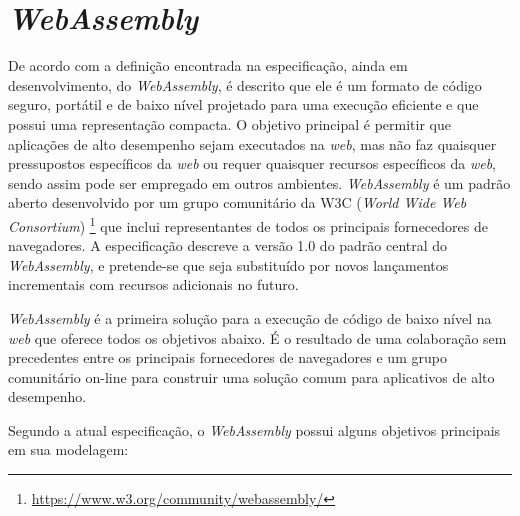 \section{\textit{WebAssembly}}
\label{sec:webassembly}

De acordo com a definição encontrada na especificação, ainda em desenvolvimento, do
\textit{WebAssembly}, é descrito que ele é um formato de código seguro, portátil e de
baixo nível projetado para uma execução eficiente e que possui uma representação compacta.
O objetivo principal é permitir que aplicações de alto desempenho sejam executados na
\textit{web}, mas não faz quaisquer pressupostos específicos da \textit{web} ou requer
quaisquer recursos específicos da \textit{web}, sendo assim pode ser empregado em outros
ambientes. \textit{WebAssembly} é um padrão aberto desenvolvido por um grupo comunitário
da W3C (\textit{World Wide Web Consortium})
\footnote[2]{\url{https://www.w3.org/community/webassembly/}} que inclui representantes de
todos os principais fornecedores de navegadores. A especificação descreve a versão 1.0 do
padrão central do \textit{WebAssembly}, e pretende-se que seja substituído por novos
lançamentos incrementais com recursos adicionais no futuro. \cite{wa}

\textit{WebAssembly} é a primeira solução para a execução de código de baixo nível na
\textit{web} que oferece todos os objetivos abaixo. É o resultado de uma colaboração sem
precedentes entre os principais fornecedores de navegadores e um grupo comunitário on-line
para construir uma solução comum para aplicativos de alto desempenho. \cite{wapaper}

Segundo a atual especificação, o \textit{WebAssembly} possui alguns objetivos principais
em sua modelagem:

